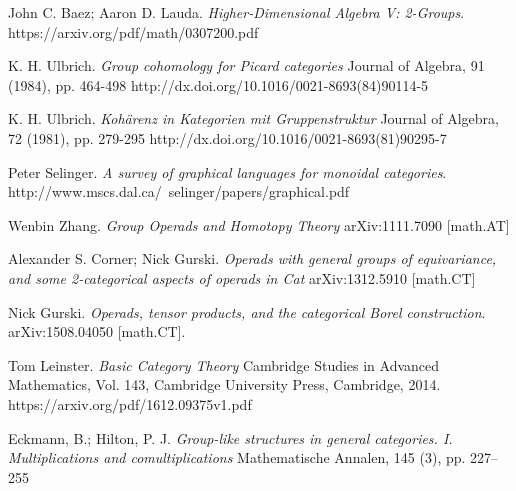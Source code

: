 \documentclass[a4paper,12pt,times,numbered,print,index]{Style/PhDThesisPSnPDF}
\numberwithin{equation}{section}
\theoremstyle{example}
\begin{document}
\begin{thebibliography}{9}

John C. Baez; Aaron D. Lauda.
\textit{Higher-Dimensional Algebra V: 2-Groups}.
https://arxiv.org/pdf/math/0307200.pdf 

K. H. Ulbrich.
\textit{Group cohomology for Picard categories}
Journal of Algebra, 91 (1984), pp. 464-498 
http://dx.doi.org/10.1016/0021-8693(84)90114-5

K. H. Ulbrich.
\textit{Kohärenz in Kategorien mit Gruppenstruktur}
Journal of Algebra, 72 (1981), pp. 279-295
http://dx.doi.org/10.1016/0021-8693(81)90295-7

Peter Selinger.
\textit{A survey of graphical languages for monoidal categories}.
http://www.mscs.dal.ca/~selinger/papers/graphical.pdf

Wenbin Zhang.
\textit{Group Operads and Homotopy Theory}
arXiv:1111.7090 [math.AT]

Alexander S. Corner; Nick Gurski.
\textit{Operads with general groups of equivariance, and some 2-categorical aspects of operads in Cat}
arXiv:1312.5910 [math.CT]

Nick Gurski. 
\textit{Operads, tensor products, and the categorical Borel construction}. 
 arXiv:1508.04050 [math.CT].

Tom Leinster.
\textit{Basic Category Theory}
Cambridge Studies in Advanced Mathematics, Vol. 143, Cambridge University Press, Cambridge, 2014.
https://arxiv.org/pdf/1612.09375v1.pdf

Eckmann, B.; Hilton, P. J. 
\textit{Group-like structures in general categories. I. Multiplications and comultiplications}
Mathematische Annalen, 145 (3), pp. 227–255

\end{thebibliography}
\end{document}
